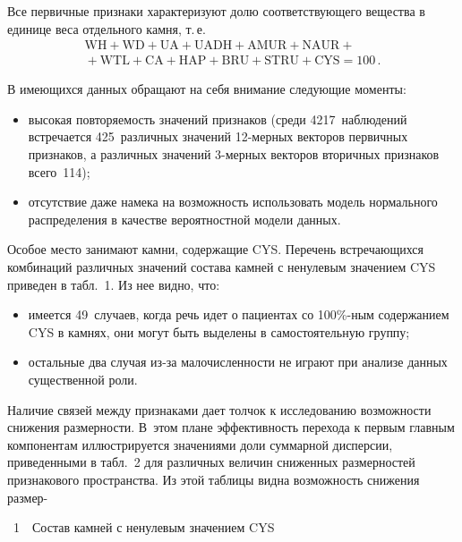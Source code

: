 \begin{multicols}{2}
 Все первичные признаки характеризуют долю 
соответствующего вещества в единице веса отдельного камня, т.\,е.\ 
\begin{multline*}
\mathrm{WH}+\mathrm{WD}+\mathrm{UA}+\mathrm{UADH}+
      \mathrm{AMUR}+\mathrm{NAUR}+{}\\
      {}+\mathrm{WTL}+\mathrm{CA}+
      \mathrm{HAP}+\mathrm{BRU}+\mathrm{STRU}+\mathrm{CYS}=100\,.
\end{multline*}
      
      В имеющихся данных обращают на себя внимание следующие моменты:
      \begin{itemize}
\item высокая повторяемость значений признаков (среди 4217~наблюдений встречается 
425~различных значений 12-мер\-ных векторов первичных признаков, а различных 
значений 3-мер\-ных векторов вторичных признаков всего~114);
\item отсутствие даже намека на возможность использовать модель нормального 
распределения в качестве вероятностной модели данных.
\end{itemize}

      Особое место занимают камни, содержащие CYS. Перечень встречающихся 
комбинаций различных значений состава камней с ненулевым значением CYS приведен в 
табл.~1. Из нее видно, что: 
      \begin{itemize}
      \item
имеется 49~случаев, когда речь идет о пациентах со 100\%-ным содержанием CYS в камнях, 
они могут быть выделены в самостоятельную группу; 
\item остальные два случая из-за малочисленности не играют при анализе данных 
существенной роли.
\end{itemize}

      Наличие связей между признаками дает толчок к исследованию возможности 
снижения раз\-мер\-ности. В~этом плане эффективность перехода к первым главным 
компонентам иллюстрируется значениями доли суммарной дисперсии, приведенными в 
табл.~2 для различных величин сниженных размерностей признакового пространства. Из 
этой таб\-ли\-цы видна возможность снижения раз\-мер-\linebreak\vspace*{-12pt}

\begin{center}  %
\vspace*{6pt}
\parbox{60mm}{{{\tablename~1}\ \ \small{Состав камней с ненулевым значением CYS}}}


\end{center}
\end{multicols}
